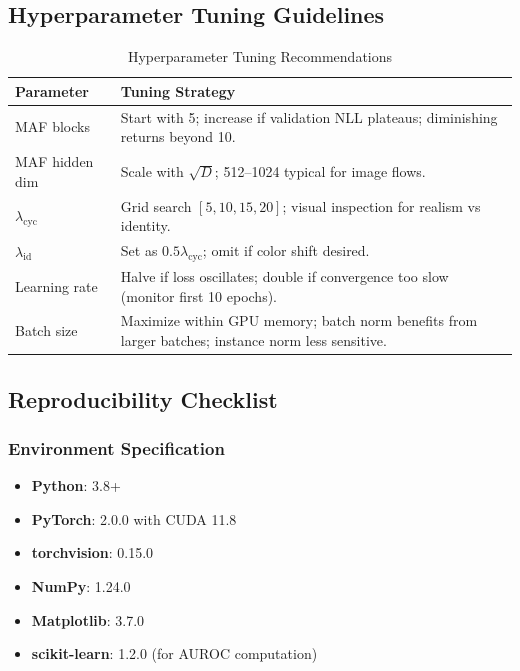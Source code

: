 \documentclass[11pt]{article}
\begin{document}
\subsection{Hyperparameter Tuning Guidelines}
\begin{table}[h!]
\centering
\caption{Hyperparameter Tuning Recommendations}
\begin{tabular}{@{}l p{8cm}@{}}
\toprule
\textbf{Parameter} & \textbf{Tuning Strategy} \\
\midrule
MAF blocks & Start with 5; increase if validation NLL plateaus; diminishing returns beyond 10. \\
MAF hidden dim & Scale with $\sqrt{D}$; 512–1024 typical for image flows. \\
$\lambda_{\text{cyc}}$ & Grid search $[5, 10, 15, 20]$; visual inspection for realism vs identity. \\
$\lambda_{\text{id}}$ & Set as $0.5 \lambda_{\text{cyc}}$; omit if color shift desired. \\
Learning rate & Halve if loss oscillates; double if convergence too slow (monitor first 10 epochs). \\
Batch size & Maximize within GPU memory; batch norm benefits from larger batches; instance norm less sensitive. \\
\bottomrule
\end{tabular}
\end{table}

\subsection{Reproducibility Checklist}
\subsubsection{Environment Specification}
\begin{itemize}
\item \textbf{Python}: 3.8+
\item \textbf{PyTorch}: 2.0.0 with CUDA 11.8
\item \textbf{torchvision}: 0.15.0
\item \textbf{NumPy}: 1.24.0
\item \textbf{Matplotlib}: 3.7.0
\item \textbf{scikit-learn}: 1.2.0 (for AUROC computation)
\end{itemize}
\end{document}
